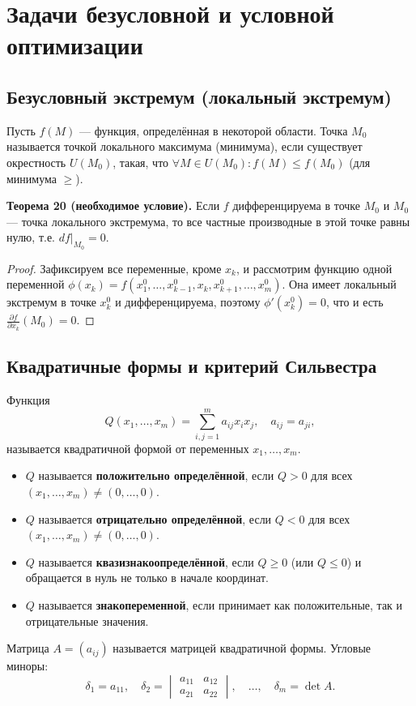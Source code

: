 \documentclass{article}
\theoremstyle{definition}
\begin{document}
\section{Задачи безусловной и условной оптимизации}

\subsection{Безусловный экстремум (локальный экстремум)}
Пусть $f(M)$ — функция, определённая в некоторой области. Точка $M_0$ называется точкой локального максимума (минимума), если существует окрестность $U(M_0)$, такая, что $\forall M\in U(M_0): f(M)\le f(M_0)$ (для минимума $\ge$).

\textbf{Теорема 20 (необходимое условие).} Если $f$ дифференцируема в точке $M_0$ и $M_0$ — точка локального экстремума, то все частные производные в этой точке равны нулю, т.е. $df|_{M_0}=0$.
\begin{proof}
Зафиксируем все переменные, кроме $x_k$, и рассмотрим функцию одной переменной $\phi(x_k)=f(x_1^0,\dots,x_{k-1}^0,x_k,x_{k+1}^0,\dots,x_m^0)$. Она имеет локальный экстремум в точке $x_k^0$ и дифференцируема, поэтому $\phi'(x_k^0)=0$, что и есть $\frac{\partial f}{\partial x_k}(M_0)=0$.
\end{proof}

\subsection{Квадратичные формы и критерий Сильвестра}
Функция
\[
Q(x_1,\dots,x_m) = \sum_{i,j=1}^{m} a_{ij} x_i x_j,\quad a_{ij}=a_{ji},
\]
называется квадратичной формой от переменных $x_1,\dots,x_m$.

\begin{itemize}
    \item $Q$ называется \textbf{положительно определённой}, если $Q>0$ для всех $(x_1,\dots,x_m)\neq(0,\dots,0)$.
    \item $Q$ называется \textbf{отрицательно определённой}, если $Q<0$ для всех $(x_1,\dots,x_m)\neq(0,\dots,0)$.
    \item $Q$ называется \textbf{квазизнакоопределённой}, если $Q\ge0$ (или $Q\le0$) и обращается в нуль не только в начале координат.
    \item $Q$ называется \textbf{знакопеременной}, если принимает как положительные, так и отрицательные значения.
\end{itemize}

Матрица $A=(a_{ij})$ называется матрицей квадратичной формы. Угловые миноры:
\[
\delta_1 = a_{11},\quad \delta_2 = \begin{vmatrix} a_{11} & a_{12} \\ a_{21} & a_{22} \end{vmatrix},\quad \dots,\quad \delta_m = \det A.
\]
\end{document}
